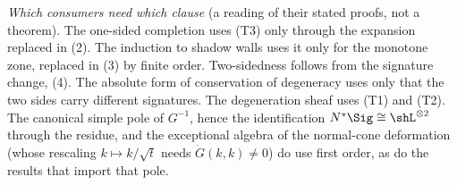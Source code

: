 \emph{Which consumers need which clause} (a reading of their stated proofs, not a theorem). The one-sided completion uses (T3) only through the expansion replaced in (2). The induction to shadow walls uses it only for the monotone zone, replaced in (3) by finite order. Two-sidedness follows from the signature change, (4). The absolute form of conservation of degeneracy uses only that the two sides carry different signatures. The degeneration sheaf uses (T1) and (T2). The canonical simple pole of $G^{-1}$, hence the identification $N^*\Sig \cong \shL^{\otimes 2}$ through the residue, and the exceptional algebra of the normal-cone deformation (whose rescaling $k \mapsto k/\sqrt t$ needs $\dot G(k,k) \neq 0$) do use first order, as do the results that import that pole.
